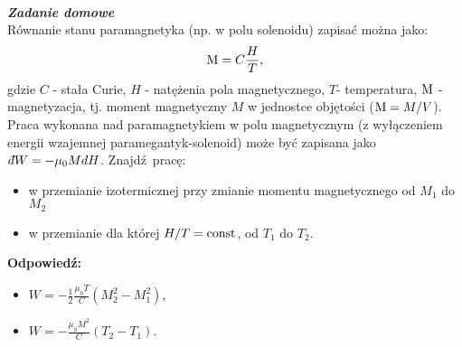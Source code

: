 \documentclass[11pt,a4paper]{article}
\newcounter{zaddom}\newcommand{\zaddom}[1][]{\addtocounter{zaddom}{1} ~\\  {\bf \emph{Zadanie domowe \arabic{zaddom} #1 }} \\}
\newcommand{\dbar}{{\mkern3mu\mathchar'26\mkern-12mu d}}
\begin{document}
\zaddom
Równanie stanu paramagnetyka (np. w polu solenoidu) zapisać można jako:
\[  {\rm M}= C \frac{H}{T}, \]
gdzie $C$ - stała Curie, $H$ - natężenia pola magnetycznego, $T$- temperatura,
$\rm M$ - magnetyzacja, tj. moment magnetyczny $M$ w jednostce objętości (${\rm M}=M/V$).
Praca wykonana nad paramagnetykiem w polu magnetycznym
 (z wyłączeniem energii wzajemnej paramegantyk-solenoid) może być zapisana jako
 $\dbar W = -\mu_0 M dH$.
Znajdź pracę: 
\begin{itemize}
\item w przemianie izotermicznej przy zmianie momentu magnetycznego od $M_1$ do $M_2$
\item w przemianie dla której $H/T={\rm const}$, od $T_1$ do $T_2$. 
\end{itemize}

\vskip 10pt
\textbf{Odpowiedź:}
\begin{itemize}
	\item $W = - \frac{1}{2} \frac{\mu_0 T}{C} \left(M_2^2 - M_1^2 \right)$,
	\item $W = - \frac{\mu_0 M^2}{C} (T_2 - T_1)$.
\end{itemize}
\end{document}
